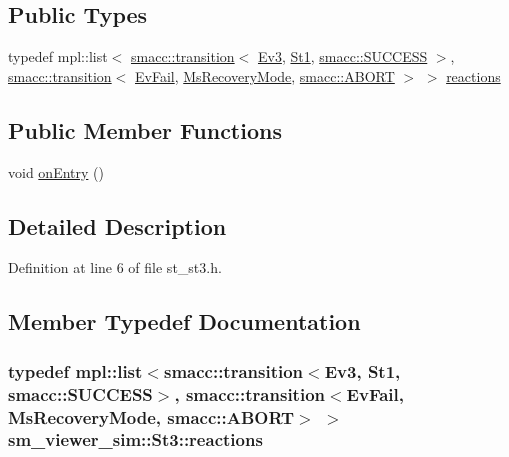 \subsection*{Public Types}
\begin{DoxyCompactItemize}
\item 
typedef mpl\+::list$<$ \hyperlink{classsmacc_1_1transition}{smacc\+::transition}$<$ \hyperlink{structsm__viewer__sim_1_1Ev3}{Ev3}, \hyperlink{structsm__viewer__sim_1_1St1}{St1}, \hyperlink{structsmacc_1_1default__transition__tags_1_1SUCCESS}{smacc\+::\+S\+U\+C\+C\+E\+SS} $>$, \hyperlink{classsmacc_1_1transition}{smacc\+::transition}$<$ \hyperlink{structsm__viewer__sim_1_1EvFail}{Ev\+Fail}, \hyperlink{structsm__viewer__sim_1_1MsRecoveryMode}{Ms\+Recovery\+Mode}, \hyperlink{structsmacc_1_1default__transition__tags_1_1ABORT}{smacc\+::\+A\+B\+O\+RT} $>$ $>$ \hyperlink{structsm__viewer__sim_1_1St3_a534a612fdf3b259a359803c2f6947edb}{reactions}
\end{DoxyCompactItemize}
\subsection*{Public Member Functions}
\begin{DoxyCompactItemize}
\item 
void \hyperlink{structsm__viewer__sim_1_1St3_a283ea2f506562090b95a40183c6b4f41}{on\+Entry} ()
\end{DoxyCompactItemize}


\subsection{Detailed Description}


Definition at line 6 of file st\+\_\+st3.\+h.



\subsection{Member Typedef Documentation}
\subsubsection[{\texorpdfstring{reactions}{reactions}}]{\setlength{\rightskip}{0pt plus 5cm}typedef mpl\+::list$<${\bf smacc\+::transition}$<${\bf Ev3}, {\bf St1}, {\bf smacc\+::\+S\+U\+C\+C\+E\+SS}$>$, {\bf smacc\+::transition}$<${\bf Ev\+Fail}, {\bf Ms\+Recovery\+Mode}, {\bf smacc\+::\+A\+B\+O\+RT}$>$ $>$ {\bf sm\+\_\+viewer\+\_\+sim\+::\+St3\+::reactions}}\hypertarget{structsm__viewer__sim_1_1St3_a534a612fdf3b259a359803c2f6947edb}{}\label{structsm__viewer__sim_1_1St3_a534a612fdf3b259a359803c2f6947edb}


